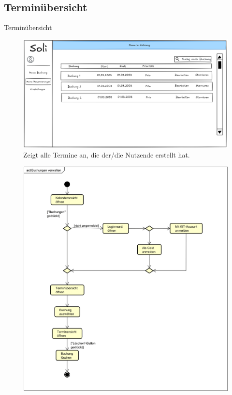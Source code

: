\documentclass{sdqbeamer}
\begin{document}
\subsection{Terminübersicht}
\begin{frame}{Terminübersicht}
    \begin{figure}
        \centering
        \includegraphics[width=\textwidth]{pictures/figures/ui/reservierungsuebersicht}
        \caption{Zeigt alle Termine an, die der/die Nutzende erstellt hat.}
        \label{fig:terminuebersicht}
    \end{figure}
\end{frame}

\begin{frame}
    \begin{figure}
        \centering
        \includegraphics[width=\textwidth]{pictures/figures/activity/buchungverwalten}
        \label{fig:terminuebersichtprozess}
    \end{figure}
\end{frame}
\end{document}
